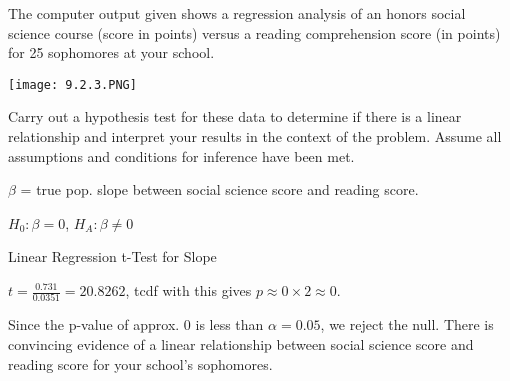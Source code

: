 \documentclass[../stats.tex]{subfiles}
\begin{document}
\begin{example}
    The computer output given shows a regression analysis of an honors social science course (score in points) versus a reading comprehension score (in points) for 25 sophomores at your school.
    \begin{center}
        \texttt{[image: 9.2.3.PNG]}
    \end{center}
    Carry out a hypothesis test for these data to determine if there is a linear relationship and interpret your results in the context of the problem. Assume all assumptions and conditions for inference have been met.

    $\beta$ = true pop. slope between social science score and reading score. 

    $H_0:\beta = 0$, $H_A:\beta\neq 0$

    Linear Regression t-Test for Slope

    $t=\frac{0.731}{0.0351}=20.8262$, tcdf with this gives $p\approx 0\times 2 \approx 0$.

    Since the p-value of approx. 0 is less than $\alpha = 0.05$, we reject the null. There is convincing evidence of a linear relationship between social science score and reading score for your school's sophomores.
\end{example}
\end{document}
